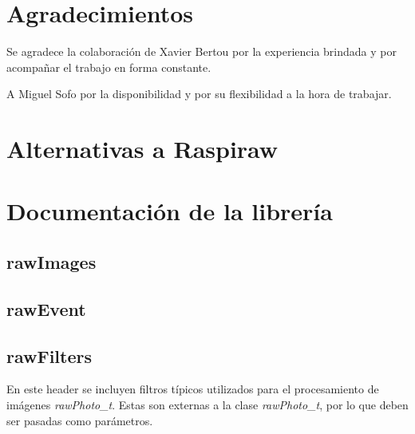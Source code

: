 \documentclass[twoside,twocolumn]{article}
\begin{document}
    
    

  \section*{Agradecimientos}
    Se agradece la colaboración de Xavier Bertou por la experiencia brindada y por
    acompañar el trabajo en forma constante.

    A Miguel Sofo por la disponibilidad y por su flexibilidad a la hora de trabajar.
   
  \clearpage
  \appendix
  \section{Alternativas a Raspiraw}\label{sec:ap_alternatives}
  
  \section{Documentación de la librería}\label{sec:ap_doc}

    \subsection{rawImages}\label{sec:ap_doc:rawImages}

    \subsection{rawEvent}\label{sec:ap_doc:rawEvent}

    \subsection{rawFilters}\label{sec:ap_doc:rawFilters}

      En este header se incluyen filtros típicos utilizados para el procesamiento de imágenes \emph{rawPhoto\_t}.
      Estas son externas a la clase \emph{rawPhoto\_t}, por lo que deben ser pasadas como parámetros. 
\end{document}
